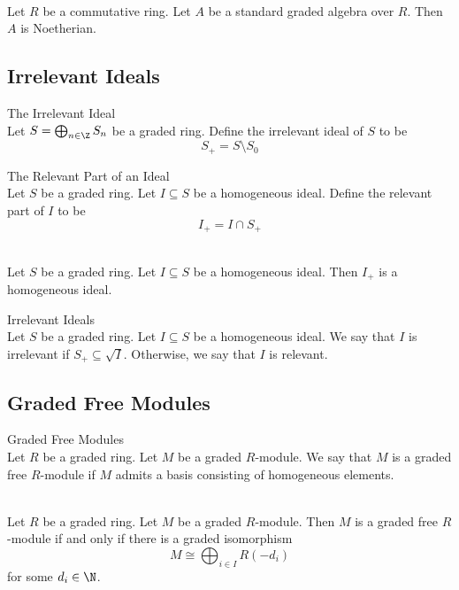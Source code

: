 \documentclass[a4paper]{article}
\begin{document}
\begin{prp}{}{}\\
Let $R$ be a commutative ring. Let $A$ be a standard graded algebra over $R$. Then $A$ is Noetherian. 
\end{prp}

\subsection{Irrelevant Ideals}
\begin{defn}{The Irrelevant Ideal}{}\\
Let $S=\bigoplus_{n\in\Z}S_n$ be a graded ring. Define the irrelevant ideal of $S$ to be $$S_+=S\setminus S_0$$
\end{defn}

\begin{defn}{The Relevant Part of an Ideal}{}\\
Let $S$ be a graded ring. Let $I\subseteq S$ be a homogeneous ideal. Define the relevant part of $I$ to be $$I_+=I\cap S_+$$
\end{defn}

\begin{lmm}{}{}\\
Let $S$ be a graded ring. Let $I\subseteq S$ be a homogeneous ideal. Then $I_+$ is a homogeneous ideal. 
\end{lmm}

\begin{defn}{Irrelevant Ideals}{}\\
Let $S$ be a graded ring. Let $I\subseteq S$ be a homogeneous ideal. We say that $I$ is irrelevant if $S_+\subseteq\sqrt{I}$. Otherwise, we say that $I$ is relevant. 
\end{defn}

\subsection{Graded Free Modules}
\begin{defn}{Graded Free Modules}{}\\
Let $R$ be a graded ring. Let $M$ be a graded $R$-module. We say that $M$ is a graded free $R$-module if $M$ admits a basis consisting of homogeneous elements. 
\end{defn}

\begin{lmm}{}{}\\
Let $R$ be a graded ring. Let $M$ be a graded $R$-module. Then $M$ is a graded free $R$-module if and only if there is a graded isomorphism $$M\cong\bigoplus_{i\in I}R(-d_i)$$ for some $d_i\in\N$. 
\end{lmm}
\end{document}
